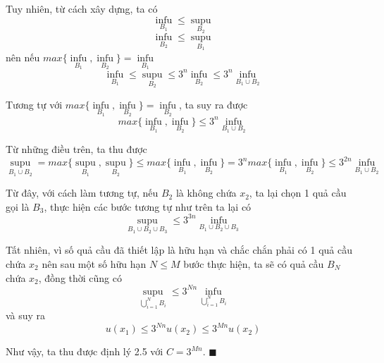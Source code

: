 Tuy nhiên, từ cách xây dựng, ta có
\[
\mathop{\inf u}\limits_{B_1} \leq \mathop{\sup u}\limits_{B_2}\]
\[\mathop{\inf u}\limits_{B_2} \leq \mathop{\sup u}\limits_{B_1}
\]
nên nếu $max \lbrace\mathop{\inf u}\limits_{B_1}, \mathop{\inf u}\limits_{B_2} \rbrace = \mathop{\inf u}\limits_{B_1}$
\[\mathop{\inf u}\limits_{B_1} \leq \mathop{\sup u}\limits_{B_2} \leq 3^n \mathop{\inf u}\limits_{B_2} \leq 3^n \mathop{\inf u}\limits_{B_1 \cup B_2}\]

Tương tự với $max \lbrace\mathop{\inf u}\limits_{B_1}, \mathop{\inf u}\limits_{B_2} \rbrace = \mathop{\inf u}\limits_{B_2}$, ta suy ra được
\[max \lbrace\mathop{\inf u}\limits_{B_1}, \mathop{\inf u}\limits_{B_2} \rbrace \leq 3^n\mathop{\inf u}\limits_{B_1 \cup B_2}\]

Từ những điều trên, ta thu được
\[\mathop{\sup u}\limits_{B_1 \cup B_2} = max \lbrace\mathop{\sup u}\limits_{B_1}, \mathop{\sup u}\limits_{B_2} \rbrace 
\leq max \lbrace\mathop{3^n\inf u}\limits_{B_1}, \mathop{3^n\inf u}\limits_{B_2} \rbrace
=3^n max \lbrace\mathop{\inf u}\limits_{B_1}, \mathop{\inf u}\limits_{B_2} \rbrace \leq 3^{2n}\mathop{\inf u}\limits_{B_1 \cup B_2}\]

Từ đây, với cách làm tương tự, nếu $B_2$ là không chứa $x_2$, ta lại chọn 1 quả cầu gọi là $B_3$, thực hiện các bước tương tự như trên ta lại có
\[\mathop{\sup u}\limits_{B_1 \cup B_2 \cup B_3} \leq 3^{3n}\mathop{\inf u}\limits_{B_1 \cup B_2 \cup B_3}\]

Tất nhiên, vì số quả cầu đã thiết lập là hữu hạn và chắc chắn phải có 1 quả cầu chứa $x_2$ nên sau một số hữu hạn $N \leq M$ bước thực hiện, ta sẽ có quả cầu $B_N$ chứa $x_2$, đồng thời cũng có
\[\mathop{\sup u}\limits_{\bigcup \limits_{i=1}^N B_i} \leq 3^{Nn}\mathop{\inf u}\limits_{\bigcup \limits_{i=1}^N B_i}\]
và suy ra
\[u(x_1) \leq 3^{Nn}u(x_2) \leq 3^{Mn}u(x_2)\]

Như vậy, ta thu được định lý 2.5 với $C=3^{Mn}$. $\blacksquare$
